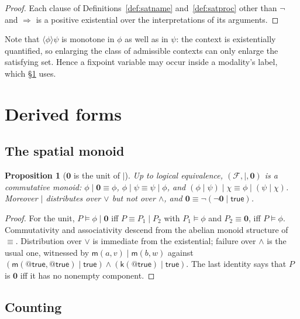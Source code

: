 \documentclass[11pt]{article}
\makeatletter
\theoremstyle{plain}
\newtheorem{proposition}[theorem]{Proposition}
\theoremstyle{definition}
\theoremstyle{remark}
\newcommand{\quo}[1]{@#1}
\newcommand{\nil}{\mathbf{0}}
\newcommand{\mm}{\mathsf{m}}
\newcommand{\kk}{\mathsf{k}}
\newcommand{\scong}{\equiv}
\newcommand{\Frm}{\mathcal{F}}
\newcommand{\may}[1]{\langle #1 \rangle}
\newcommand{\sat}{\models}
\makeatother
\begin{document}
\begin{proof}
Each clause of Definitions~\ref{def:satname} and~\ref{def:satproc} other than
$\neg$ and $\Rightarrow$ is a positive existential over the interpretations of
its arguments.
\end{proof}

Note that $\may{\phi}\psi$ is monotone in $\phi$ as well as in $\psi$: the
context is existentially quantified, so enlarging the class of admissible
contexts can only enlarge the satisfying set. Hence a fixpoint variable may
occur inside a modality's label, which \S\ref{sec:derived} uses.

\section{Derived forms}
\label{sec:derived}

\subsection{The spatial monoid}

\begin{proposition}[$\nil$ is the unit of $\mid$]
\label{prop:unit}
Up to logical equivalence, $(\Frm,\mid,\nil)$ is a commutative monoid:
$\phi \mid \nil \equiv \phi$, $\phi \mid \psi \equiv \psi \mid \phi$, and
$(\phi \mid \psi) \mid \chi \equiv \phi \mid (\psi \mid \chi)$. Moreover $\mid$
distributes over $\vee$ but not over $\wedge$, and
$\nil \equiv \neg(\neg\nil \mid \mathsf{true})$.
\end{proposition}

\begin{proof}
For the unit, $P \sat \phi \mid \nil$ iff $P \scong P_1 \mid P_2$ with
$P_1 \sat \phi$ and $P_2 \scong \nil$, iff $P \sat \phi$. Commutativity and
associativity descend from the abelian monoid structure of $\scong$.
Distribution over $\vee$ is immediate from the existential; failure over
$\wedge$ is the usual one, witnessed by
$\mm(a,v) \mid \mm(b,w)$ against
$(\mm(\quo{\mathsf{true}},\quo{\mathsf{true}}) \mid \mathsf{true}) \wedge
(\kk(\quo{\mathsf{true}}) \mid \mathsf{true})$.
The last identity says that $P$ is $\nil$ iff it has no nonempty component.
\end{proof}

\subsection{Counting}
\end{document}
